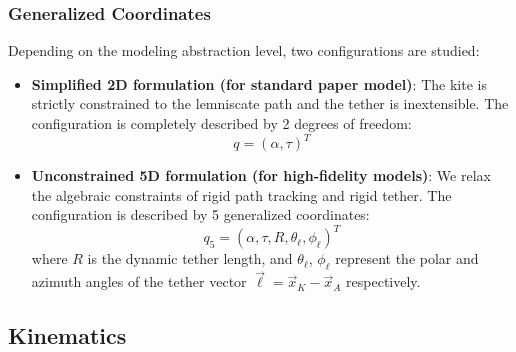 \documentclass{article}
\begin{document}
\subsubsection{Generalized Coordinates}
Depending on the modeling abstraction level, two configurations are studied:
\begin{itemize}
    \item \textbf{Simplified 2D formulation (for standard paper model)}: The kite is strictly constrained to the lemniscate path and the tether is inextensible. The configuration is completely described by 2 degrees of freedom:
    \begin{equation}
    q = (\alpha, \tau)^T
    \end{equation}
    \item \textbf{Unconstrained 5D formulation (for high-fidelity models)}: We relax the algebraic constraints of rigid path tracking and rigid tether. The configuration is described by 5 generalized coordinates:
    \begin{equation}
    q_5 = (\alpha, \tau, R, \theta_\ell, \phi_\ell)^T
    \end{equation}
    where $R$ is the dynamic tether length, and $\theta_\ell$, $\phi_\ell$ represent the polar and azimuth angles of the tether vector $\vec{\ell} = \vec{x}_K - \vec{x}_A$ respectively.
\end{itemize}

\subsection{Kinematics}
\end{document}
